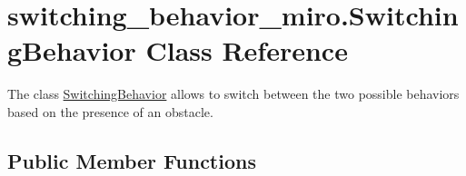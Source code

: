 \hypertarget{classswitching__behavior__miro_1_1SwitchingBehavior}{}\section{switching\+\_\+behavior\+\_\+miro.\+Switching\+Behavior Class Reference}
\label{classswitching__behavior__miro_1_1SwitchingBehavior}


The class \mbox{\hyperlink{classswitching__behavior__miro_1_1SwitchingBehavior}{Switching\+Behavior}} allows to switch between the two possible behaviors based on the presence of an obstacle.  


\subsection*{Public Member Functions}
